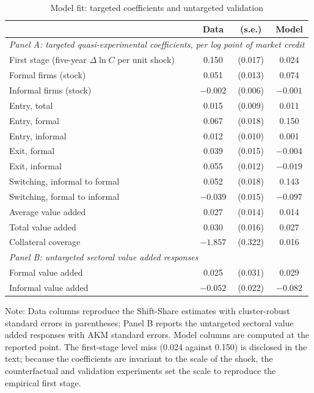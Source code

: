 \documentclass[12pt]{article}
\begin{document}
\begin{table}[H]
    \centering\footnotesize
    \caption{Model fit: targeted coefficients and untargeted validation}
    \label{tab:est-fit}
    \begin{threeparttable}
        \begin{tabular}{lccc}
        \toprule
         & Data & (s.e.) & Model \\
        \midrule
        \multicolumn{4}{l}{\textit{Panel A: targeted quasi-experimental coefficients, per log point of market credit}} \\
        First stage (five-year $\Delta \ln C$ per unit shock) & 0.150 & (0.017) & 0.024 \\
        Formal firms (stock) & 0.051 & (0.013) & 0.074 \\
        Informal firms (stock) & $-0.002$ & (0.006) & $-0.001$ \\
        Entry, total & 0.015 & (0.009) & 0.011 \\
        Entry, formal & 0.067 & (0.018) & 0.150 \\
        Entry, informal & 0.012 & (0.010) & 0.001 \\
        Exit, formal & 0.039 & (0.015) & $-0.004$ \\
        Exit, informal & 0.055 & (0.012) & $-0.019$ \\
        Switching, informal to formal & 0.052 & (0.018) & 0.143 \\
        Switching, formal to informal & $-0.039$ & (0.015) & $-0.097$ \\
        Average value added & 0.027 & (0.014) & 0.014 \\
        Total value added & 0.030 & (0.016) & 0.027 \\
        Collateral coverage & $-1.857$ & (0.322) & 0.016 \\
        \midrule
        \multicolumn{4}{l}{\textit{Panel B: untargeted sectoral value added responses}} \\
        Formal value added & 0.025 & (0.031) & 0.029 \\
        Informal value added & $-0.052$ & (0.022) & $-0.082$ \\
        \bottomrule
        \end{tabular}
        \begin{tablenotes}
            \footnotesize
            \item Note: Data columns reproduce the Shift-Share estimates with cluster-robust standard errors in parentheses; Panel B reports the untargeted sectoral value added responses with AKM standard errors. Model columns are computed at the reported point. The first-stage level miss (0.024 against 0.150) is disclosed in the text; because the coefficients are invariant to the scale of the shock, the counterfactual and validation experiments set the scale to reproduce the empirical first stage.
        \end{tablenotes}
    \end{threeparttable}
\end{table}
\end{document}
